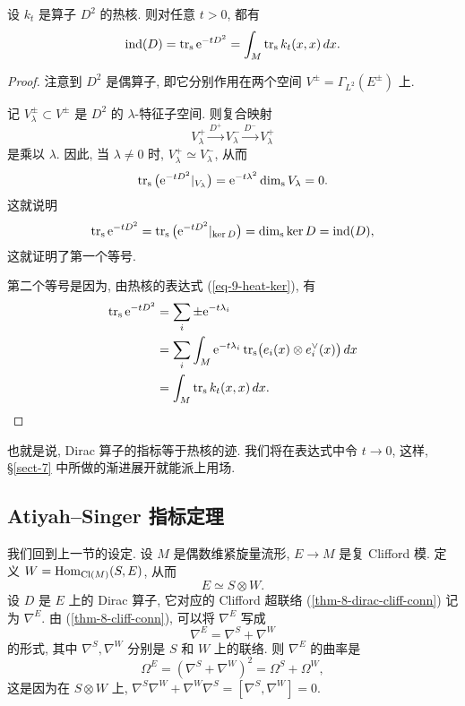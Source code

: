 \begin{theorem}  \label{thm-9-mckean-singer}
    设 $k_t$ 是算子 $D^2$ 的热核. 则对任意 $t > 0$, 都有
    \[ \operatorname{ind} (D) = \operatorname{tr}_{\mathrm{s}} \mathrm{e}^{-t D^2} = \int_M \operatorname{tr}_{\mathrm{s}} k_t (x, x) \, dx. \]
\end{theorem}

\begin{proof}
    注意到 $D^2$ 是偶算子, 即它分别作用在两个空间 $V^{\pm} = \Gamma_{L^2} (E^{\pm})$ 上.
    
    记 $V_\lambda^{\pm} \subset V^{\pm}$ 是 $D^2$ 的 $\lambda$-特征子空间.
    则复合映射
    \[ V_\lambda^+ \overset{D^+}{\longrightarrow}
        V_\lambda^- \overset{D^-}{\longrightarrow} V_\lambda^+ \]
    是乘以 $\lambda$. 因此, 当 $\lambda \neq 0$ 时,
    $V_\lambda^+ \simeq V_\lambda^-$, 从而
    \[ \operatorname{tr}_{\mathrm{s}} {} \bigl( \mathrm{e}^{-t D^2} |_{V_\lambda} \bigr)
        = \mathrm{e}^{-t \lambda^2} \operatorname{dim}_{\mathrm{s}} V_\lambda = 0. \]
    这就说明
    \[ \operatorname{tr}_{\mathrm{s}} \mathrm{e}^{-t D^2} = \operatorname{tr}_{\mathrm{s}} {} \bigl( \mathrm{e}^{-t D^2} |_{\ker D} \bigr )
        = \operatorname{dim}_{\mathrm{s}} \ker D = \operatorname{ind} (D), \]
    这就证明了第一个等号.
    
    第二个等号是因为, 由热核的表达式 (\ref{eq-9-heat-ker}), 有
    \begin{align*}
        \operatorname{tr}_{\mathrm{s}} \mathrm{e}^{-t D^2}
        &= \sum_i \pm \mathrm{e}^{-t \lambda_i} \\
        &= \sum_i \int_M \mathrm{e}^{-t \lambda_i} 
            \operatorname{tr}_{\mathrm{s}} \bigl( e_i (x) \otimes e_i^\vee (x) \bigr) \, dx \\
        &= \int_M \operatorname{tr}_{\mathrm{s}} k_t (x, x) \, dx. \qedhere
    \end{align*}
\end{proof}

也就是说, Dirac 算子的指标等于热核的迹.
我们将在表达式中令 $t \to 0$, 这样, \S\ref{sect-7} 中所做的渐进展开就能派上用场.


\subsection{Atiyah--Singer 指标定理}

我们回到上一节的设定.
设 $M$ 是偶数维紧旋量流形, $E \to M$ 是复 Clifford 模.
定义 $W = \operatorname{Hom}_{\operatorname{Cl} (M)} (S, E)$, 从而
\[ E \simeq S \otimes W. \]
设 $D$ 是 $E$ 上的 Dirac 算子, 
它对应的 Clifford 超联络 (\ref{thm-8-dirac-cliff-conn}) 记为 $\nabla^E$.
由 (\ref{thm-8-cliff-conn}), 可以将 $\nabla^E$ 写成
\[ \nabla^E = \nabla^S + \nabla^W \]
的形式, 其中 $\nabla^S, \nabla^W$ 分别是 $S$ 和 $W$ 上的联络. 则 $\nabla^E$ 的曲率是
\begin{equation} \label{eq-9-curv-sum}
    \Omega^E = (\nabla^S + \nabla^W)^2 = \Omega^S + \Omega^W,
\end{equation}
这是因为在 $S \otimes W$ 上,
$\nabla^S \nabla^W + \nabla^W \nabla^S = [\nabla^S, \nabla^W] = 0$.

